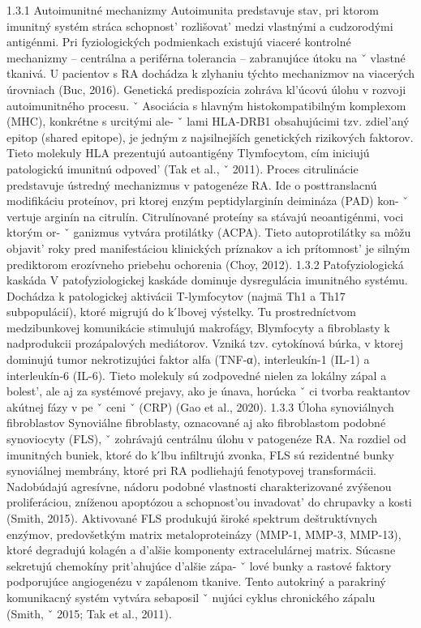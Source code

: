 { 1.3.1 Autoimunitné mechanizmy Autoimunita predstavuje stav, pri ktorom imunitný systém stráca schopnost’ rozlišovat’ medzi vlastnými a cudzorodými antigénmi. Pri fyziologických podmienkach existujú viaceré kontrolné mechanizmy – centrálna a periférna tolerancia – zabranujúce útoku na ˇ vlastné tkanivá. U pacientov s RA dochádza k zlyhaniu týchto mechanizmov na viacerých úrovniach (Buc, 2016).
 Genetická predispozícia zohráva kl’úcovú úlohu v rozvoji autoimunitného procesu. ˇ Asociácia s hlavným histokompatibilným komplexom (MHC), konkrétne s urcitými ale- ˇ lami HLA-DRB1 obsahujúcimi tzv. zdiel’aný epitop (shared epitope), je jedným z najsilnejších genetických rizikových faktorov. Tieto molekuly HLA prezentujú autoantigény Tlymfocytom, cím iniciujú patologickú imunitnú odpoved’ (Tak et al., ˇ 2011).
 Proces citrulinácie predstavuje ústredný mechanizmus v patogenéze RA. Ide o posttranslacnú modifikáciu proteínov, pri ktorej enzým peptidylarginín deimináza (PAD) kon- ˇ vertuje arginín na citrulín. Citrulínované proteíny sa stávajú neoantigénmi, voci ktorým or- ˇ ganizmus vytvára protilátky (ACPA). Tieto autoprotilátky sa môžu objavit’ roky pred manifestáciou klinických príznakov a ich prítomnost’ je silným prediktorom erozívneho priebehu ochorenia (Choy, 2012).
 1.3.2 Patofyziologická kaskáda V patofyziologickej kaskáde dominuje dysregulácia imunitného systému. Dochádza k patologickej aktivácii T-lymfocytov (najmä Th1 a Th17 subpopulácií), ktoré migrujú do k ́lbovej výstelky. Tu prostredníctvom medzibunkovej komunikácie stimulujú makrofágy, Blymfocyty a fibroblasty k nadprodukcii prozápalových mediátorov. Vzniká tzv. cytokínová búrka, v ktorej dominujú tumor nekrotizujúci faktor alfa (TNF-α), interleukín-1 (IL-1) a interleukín-6 (IL-6). Tieto molekuly sú zodpovedné nielen za lokálny zápal a bolest’, ale aj za systémové prejavy, ako je únava, horúcka ˇ ci tvorba reaktantov akútnej fázy v pe ˇ ceni ˇ (CRP) (Gao et al., 2020).
 1.3.3 Úloha synoviálnych fibroblastov Synoviálne fibroblasty, oznacované aj ako fibroblastom podobné synoviocyty (FLS), ˇ zohrávajú centrálnu úlohu v patogenéze RA. Na rozdiel od imunitných buniek, ktoré do k ́lbu infiltrujú zvonka, FLS sú rezidentné bunky synoviálnej membrány, ktoré pri RA podliehajú fenotypovej transformácii. Nadobúdajú agresívne, nádoru podobné vlastnosti charakterizované zvýšenou proliferáciou, zníženou apoptózou a schopnost’ou invadovat’ do chrupavky a kosti (Smith, 2015).
 Aktivované FLS produkujú široké spektrum deštruktívnych enzýmov, predovšetkým matrix metaloproteinázy (MMP-1, MMP-3, MMP-13), ktoré degradujú kolagén a d’alšie komponenty extracelulárnej matrix. Súcasne sekretujú chemokíny prit’ahujúce d’alšie zápa- ˇ lové bunky a rastové faktory podporujúce angiogenézu v zapálenom tkanive. Tento autokriný a parakriný komunikacný systém vytvára sebaposil ˇ nujúci cyklus chronického zápalu (Smith, ˇ 2015; Tak et al., 2011).
}
